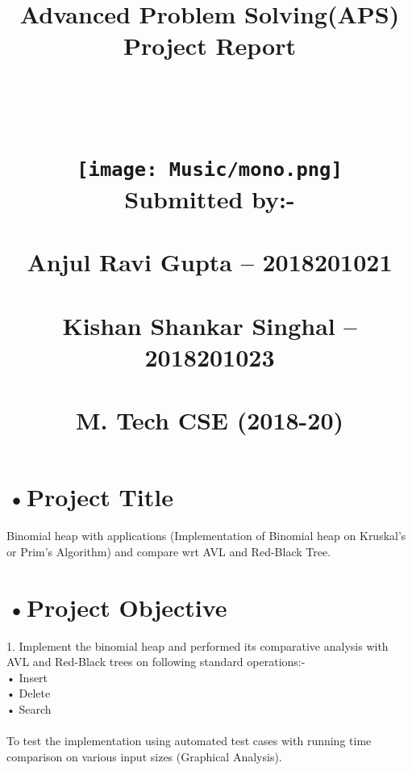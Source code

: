 \documentclass[10pt,a4paper]{article} ,
\title{
		\usefont{OT1}{bch}{b}{n}
		\normalfont \normalsize \textsc{} \\ [25pt]
		\horrule \\[0.4cm]
		\huge Advanced Problem Solving(APS) \\Project Report \\ \\
	\\ \\
	    	\texttt{[image: Music/mono.png]} 
		\\ Submitted by:- \\ \\
		Anjul Ravi Gupta – 2018201021\\
	\\Kishan Shankar Singhal – 2018201023 \\ \\
	M. Tech CSE (2018-20)
		\horrule \\[0.5cm]
		\date{\vspace{-5ex}}
}
\begin{document}
\maketitle

   
\section*{•Project Title}

      Binomial heap with applications (Implementation of Binomial heap on Kruskal’s or Prim’s Algorithm) and compare wrt AVL and Red-Black Tree.
      
\section*{•Project Objective}
	
	1. Implement the binomial heap and performed its comparative analysis with AVL and Red-Black trees on following standard operations:-\\
    • Insert\\
    • Delete\\
    • Search\\
\\To test the implementation using automated test cases with running time comparison on various input sizes (Graphical Analysis).\\
\end{document}
